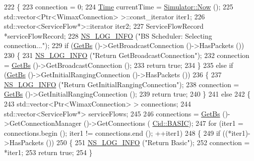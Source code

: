 \begin{DoxyCode}
222 \{
223   connection = 0;
224   \hyperlink{namespacens3_1_1TracedValueCallback_a7ffd3e7c142ffe7c8a1d2db9b8de38ec}{Time} currentTime = \hyperlink{classns3_1_1Simulator_ac3178fa975b419f7875e7105be122800}{Simulator::Now} ();
225   std::vector<Ptr<WimaxConnection> >::const\_iterator iter1;
226   std::vector<ServiceFlow*>::iterator iter2;
227   ServiceFlowRecord *serviceFlowRecord;
228   \hyperlink{group__logging_gafbd73ee2cf9f26b319f49086d8e860fb}{NS\_LOG\_INFO} (\textcolor{stringliteral}{"BS Scheduler: Selecting connection..."});
229   \textcolor{keywordflow}{if} (\hyperlink{classns3_1_1BSScheduler_a8b09065ac8f74cb35446af55128e41c7}{GetBs} ()->GetBroadcastConnection ()->HasPackets ())
230     \{
231       \hyperlink{group__logging_gafbd73ee2cf9f26b319f49086d8e860fb}{NS\_LOG\_INFO} (\textcolor{stringliteral}{"Return GetBroadcastConnection"});
232       connection = \hyperlink{classns3_1_1BSScheduler_a8b09065ac8f74cb35446af55128e41c7}{GetBs} ()->GetBroadcastConnection ();
233       \textcolor{keywordflow}{return} \textcolor{keyword}{true};
234     \}
235   \textcolor{keywordflow}{else} \textcolor{keywordflow}{if} (\hyperlink{classns3_1_1BSScheduler_a8b09065ac8f74cb35446af55128e41c7}{GetBs} ()->GetInitialRangingConnection ()->HasPackets ())
236     \{
237       \hyperlink{group__logging_gafbd73ee2cf9f26b319f49086d8e860fb}{NS\_LOG\_INFO} (\textcolor{stringliteral}{"Return GetInitialRangingConnection"});
238       connection = \hyperlink{classns3_1_1BSScheduler_a8b09065ac8f74cb35446af55128e41c7}{GetBs} ()->GetInitialRangingConnection ();
239       \textcolor{keywordflow}{return} \textcolor{keyword}{true};
240     \}
241   \textcolor{keywordflow}{else}
242     \{
243       std::vector<Ptr<WimaxConnection> > connections;
244       std::vector<ServiceFlow*> serviceFlows;
245 
246       connections = \hyperlink{classns3_1_1BSScheduler_a8b09065ac8f74cb35446af55128e41c7}{GetBs} ()->GetConnectionManager ()->GetConnections (
      \hyperlink{classns3_1_1Cid_a10b8f92080ca5790e65a0bfa2f557e0aa68b82b5b38abe3f2b40e5e3d950ac746}{Cid::BASIC});
247       \textcolor{keywordflow}{for} (iter1 = connections.begin (); iter1 != connections.end (); ++iter1)
248         \{
249           \textcolor{keywordflow}{if} ((*iter1)->HasPackets ())
250             \{
251               \hyperlink{group__logging_gafbd73ee2cf9f26b319f49086d8e860fb}{NS\_LOG\_INFO} (\textcolor{stringliteral}{"Return Basic"});
252               connection = *iter1;
253               \textcolor{keywordflow}{return} \textcolor{keyword}{true};
254             \}

\end{DoxyCode}
